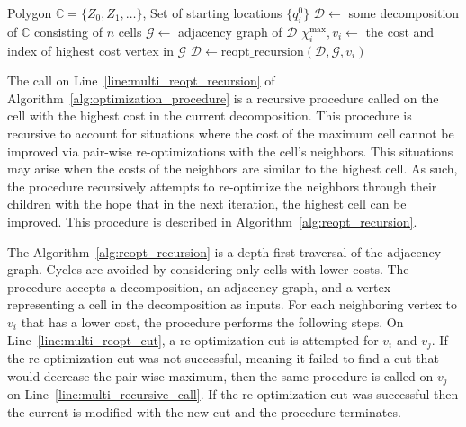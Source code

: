 \documentclass[../main.tex]{subfiles}
\begin{document}
\begin{algorithm}
	\caption{$\text{optimization\_procedure}(\mathbb{C}, \{q^0_i\})$}
	\label{alg:optimization_procedure}
	\begin{algorithmic}[1]
		\REQUIRE Polygon $\mathbb{C}=\{Z_0,Z_1,\ldots\}$, Set of starting locations $\{q^0_i\}$
			\STATE $\mathcal{D}\gets$ some decomposition of $\mathbb{C}$ consisting of $n$ cells \label{line:multi_init_decomp}
			\REPEAT
			\STATE $\mathcal{G}\gets$ adjacency graph of $\mathcal{D}$ \label{line:multi_adjacency}
			\STATE $\chi^{\max}_i,v_i\gets$ the cost and index of highest cost vertex in $\mathcal{G}$ \label{line:multi_cost}
			\STATE $\mathcal{D}\gets\text{reopt\_recursion}(\mathcal{D},\mathcal{G}, v_i)$ \label{line:multi_reopt_recursion}
	\end{algorithmic}
\end{algorithm}

The call on Line~\ref{line:multi_reopt_recursion} of Algorithm~\ref{alg:optimization_procedure} is a recursive procedure called on the cell with the highest cost in the current decomposition. This procedure is recursive to account for situations where the cost of the maximum cell cannot be improved via pair-wise re-optimizations with the cell's neighbors. This situations may arise when the costs of the neighbors are similar to the highest cell. As such, the procedure recursively attempts to re-optimize the neighbors through their children with the hope that in the next iteration, the highest cell can be improved. This procedure is described in Algorithm~\ref{alg:reopt_recursion}.

The Algorithm~\ref{alg:reopt_recursion} is a depth-first traversal of the adjacency graph. Cycles are avoided by considering only cells with lower costs. The procedure accepts a decomposition, an adjacency graph, and a vertex representing a cell in the decomposition as inputs. For each neighboring vertex to $v_i$ that has a lower cost, the procedure performs the following steps. On Line~\ref{line:multi_reopt_cut}, a re-optimization cut is attempted for $v_i$ and $v_j$. If the re-optimization cut was not successful, meaning it failed to find a cut that would decrease the pair-wise maximum, then the same procedure is called on $v_j$ on Line~\ref{line:multi_recursive_call}. If the re-optimization cut was successful then the current is modified with the new cut and the procedure terminates.
\end{document}
